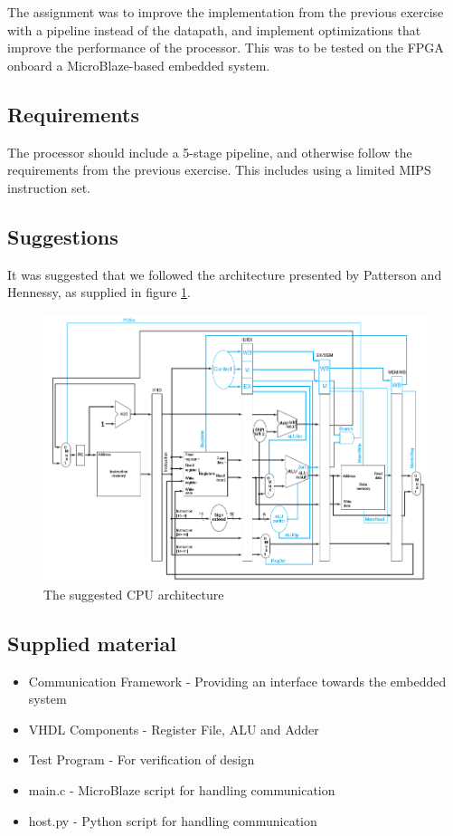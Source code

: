 The assignment was to improve the implementation from the previous exercise with
a pipeline instead of the datapath, and implement optimizations that improve the
performance of the processor. This was to be tested on the FPGA onboard a 
MicroBlaze-based embedded system.

\subsection{Requirements}
The processor should include a 5-stage pipeline, and otherwise follow the
requirements from the previous exercise. This includes using a limited MIPS
instruction set.

\subsection{Suggestions}
It was suggested that we followed the architecture presented by Patterson and
Hennessy, as supplied in figure \ref{fig:suggestedArchitecture}.

\begin{figure}[ht]
    \centering
    \includegraphics[width=\textwidth]{figures/SuggestedArchitecture.png}
    \caption{The suggested CPU architecture} 
    \label{fig:suggestedArchitecture}
\end{figure}


\subsection{Supplied material}
\begin{itemize}
    \item Communication Framework -  Providing an interface towards the embedded system
    \item VHDL Components - Register File, ALU and Adder
    \item Test Program - For verification of design
    \item main.c - MicroBlaze script for handling communication
    \item host.py - Python script for handling communication
\end{itemize}

